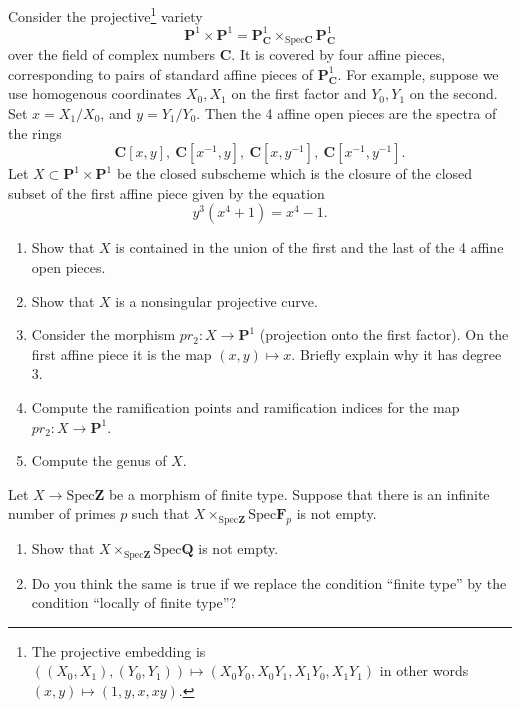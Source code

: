 \begin{exercise}
Consider the
projective\footnote{The projective embedding is
$((X_0,X_1),(Y_0,Y_1))\mapsto (X_0Y_0,X_0Y_1,X_1Y_0,X_1Y_1)$
in other words $(x,y)\mapsto (1,y,x,xy)$.} variety
$$
{\mathbf P}^1 \times {\mathbf P}^1 = {\mathbf P}^1_{{\mathbf C}} \times_{\text{Spec} {\mathbf C}} {\mathbf P}^1_{\mathbf C}
$$
over the field of complex numbers ${\mathbf C}$. It is covered by four affine pieces,
corresponding to pairs of standard affine pieces of ${\mathbf P}^1_{\mathbf C}$. For example,
suppose we use homogenous coordinates $X_0, X_1$ on the first factor and
$Y_0, Y_1$ on the second. Set $x=X_1/X_0$, and $y=Y_1/Y_0$. Then the 4 affine
open pieces are the spectra of the  rings
$$ 
{\mathbf C}[x,y],\ 
{\mathbf C}[x^{-1},y],\ 
{\mathbf C}[x,y^{-1}],\ 
{\mathbf C}[x^{-1},y^{-1}].
$$
Let $X \subset {\mathbf P}^1 \times {\mathbf P}^1$ be the closed subscheme which is the
closure of the closed subset of the first affine piece given by the equation
$$
y^3(x^4+1) = x^4 -1.
$$
\begin{enumerate}
\item Show that $X$ is contained in the union of the first and
the last of the 4 affine open pieces.
\item Show that $X$ is a nonsingular projective curve.
\item Consider the morphism $pr_2 : X \to {\mathbf P}^1$ (projection onto
the first factor). On the first affine piece it is the map $(x,y) \mapsto x$.
Briefly explain why it has degree $3$.
\item Compute the ramification points and ramification indices 
for the map $pr_2 : X \to {\mathbf P}^1$.
\item Compute the genus of $X$.
\end{enumerate}
\end{exercise}

\begin{exercise}
Let $X \to \text{Spec} {\mathbf Z}$ be a morphism of finite type. Suppose that
there is an infinite number of primes $p$ such that
$X\times_{\text{Spec} {\mathbf Z}} \text{Spec} {\mathbf F}_p$ is not empty. 
\begin{enumerate}
\item Show that $X \times_{\text{Spec} {\mathbf Z}}\text{Spec} \mathbf{Q}$ is not empty.
\item Do you think the same is true if we replace the condition
``finite type'' by the condition ``locally of finite type''?
\end{enumerate}
\end{exercise}









